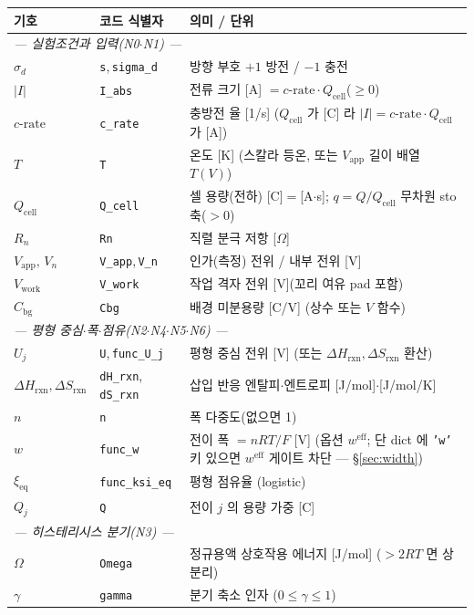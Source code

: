 \documentclass[11pt,a4paper]{article}
\newcommand{\eff}{\mathrm{eff}}
\newcommand{\eq}{\mathrm{eq}}
\newcommand{\app}{\mathrm{app}}
\newcommand{\cell}{\mathrm{cell}}
\newcommand{\bg}{\mathrm{bg}}
\newcommand{\work}{\mathrm{work}}
\newcommand{\sgn}{\sigma_d}
\begin{document}
\begin{longtable}{p{} p{} p{}}
\toprule 기호 & 코드 식별자 & 의미 / 단위 \\ \midrule \endhead
\multicolumn{3}{l}{\emph{— 실험조건과 입력(N0$\cdot$N1) —}}\\
$\sgn$ & \texttt{s},\,\texttt{sigma\_d} & 방향 부호 $+1$ 방전 / $-1$ 충전 \\
$|I|$ & \texttt{I\_abs} & 전류 크기 [A] $=c\text{-rate}\cdot Q_\cell$($\ge0$) \\
$c\text{-rate}$ & \texttt{c\_rate} & 충방전 율 [1/s] ($Q_\cell$ 가 [C] 라 $|I|=c\text{-rate}\cdot Q_\cell$ 가 [A]) \\
$T$ & \texttt{T} & 온도 [K] (스칼라 등온, 또는 $V_\app$ 길이 배열 $T(V)$) \\
$Q_\cell$ & \texttt{Q\_cell} & 셀 용량(전하) [C]$=$[A$\cdot$s]; $q=Q/Q_\cell$ 무차원 sto 축($>0$) \\
$R_n$ & \texttt{Rn} & 직렬 분극 저항 [$\Omega$] \\
$V_\app,\,V_n$ & \texttt{V\_app},\,\texttt{V\_n} & 인가(측정) 전위 / 내부 전위 [V] \\
$V_\work$ & \texttt{V\_work} & 작업 격자 전위 [V](꼬리 여유 pad 포함) \\
$C_\bg$ & \texttt{Cbg} & 배경 미분용량 [C/V] (상수 또는 $V$ 함수) \\
\multicolumn{3}{l}{\emph{— 평형 중심$\cdot$폭$\cdot$점유(N2$\cdot$N4$\cdot$N5$\cdot$N6) —}}\\
$U_j$ & \texttt{U},\,\texttt{func\_U\_j} & 평형 중심 전위 [V] (또는 $\Delta H_{\mathrm{rxn}},\Delta S_{\mathrm{rxn}}$ 환산) \\
$\Delta H_{\mathrm{rxn}},\Delta S_{\mathrm{rxn}}$ & \texttt{dH\_rxn},\,\texttt{dS\_rxn} & 삽입 반응 엔탈피$\cdot$엔트로피 [J/mol]$\cdot$[J/mol/K] \\
$n$ & \texttt{n} & 폭 다중도(없으면 1) \\
$w$ & \texttt{func\_w} & 전이 폭 $=nRT/F$ [V] (옵션 $w^\eff$; 단 dict 에 \texttt{'w'} 키 있으면 $w^\eff$ 게이트 차단 — \S\ref{sec:width}) \\
$\xi_\eq$ & \texttt{func\_ksi\_eq} & 평형 점유율 (logistic) \\
$Q_j$ & \texttt{Q} & 전이 $j$ 의 용량 가중 [C] \\
\multicolumn{3}{l}{\emph{— 히스테리시스 분기(N3) —}}\\
$\Omega$ & \texttt{Omega} & 정규용액 상호작용 에너지 [J/mol] ($>2RT$ 면 상분리) \\
$\gamma$ & \texttt{gamma} & 분기 축소 인자 ($0\le\gamma\le1$) \\

\end{longtable}
\end{document}
